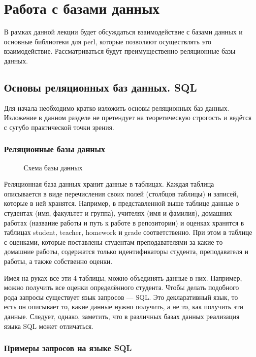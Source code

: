 \setcounter{chapter}{6}
\chapter{Работа с базами данных}


В рамках данной лекции будет обсуждаться взаимодействие с базами данных и основные библиотеки для perl, которые позволяют осуществлять это взаимодействие. Рассматриваться будут преимущественно реляционные базы данных.
\section{Основы реляционных баз данных. SQL}
Для начала необходимо кратко изложить основы реляционных баз данных. Изложение в данном разделе не претендует на теоретическую строгость и ведётся с сугубо практической точки зрения.

\subsection{Реляционные базы данных}
\begin{figure}[H] \centering
  
  \caption{Схема базы данных}
\end{figure}

Реляционная база данных хранит данные в таблицах. Каждая таблица описывается в виде перечисления своих полей (столбцов таблицы) и записей, которые в ней хранятся. Например, в представленной выше таблице данные о студентах (имя, факультет и группа), учителях (имя и фамилия), домашних работах (название работы и путь к работе в репозитории) и оценках хранятся в таблицах student, teacher, homework и grade соответственно. При этом в таблице с оценками, которые поставлены студентам преподавателями за какие-то домашние работы, содержатся только идентификаторы студента, преподавателя и работы, а также собственно оценки.

Имея на руках все эти 4 таблицы, можно объединять данные в них. Например, можно получить все оценки определённого студента. Чтобы делать подобного рода запросы существует язык запросов --- SQL. Это декларативный язык, то есть он описывает то, какие данные нужно получить, а не то, как получить эти данные. Следует, однако, заметить, что в различных базах данных реализация языка SQL может отличаться.


\subsection{Примеры запросов на языке SQL}

